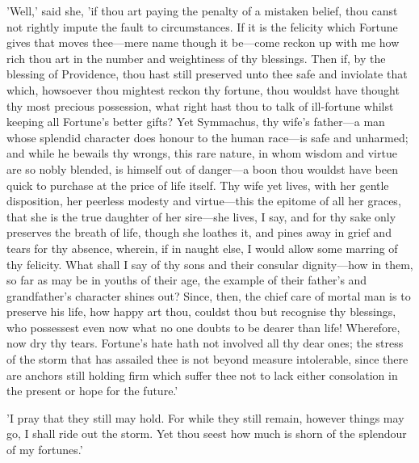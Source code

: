 'Well,' said she, 'if thou art paying the penalty of a mistaken belief,
thou canst not rightly impute the fault to circumstances. If it is the
felicity which Fortune gives that moves thee—mere name though it
be—come reckon up with me how rich thou art in the number and
weightiness of thy blessings. Then if, by the blessing of Providence,
thou hast still preserved unto thee safe and inviolate that which,
howsoever thou mightest reckon thy fortune, thou wouldst have thought
thy most precious possession, what right hast thou to talk of
ill-fortune whilst keeping all Fortune's better gifts? Yet Symmachus,
thy wife's father—a man whose splendid character does honour to the
human race—is safe and unharmed; and while he bewails thy wrongs, this
rare nature, in whom wisdom and virtue are so nobly blended, is himself
out of danger—a boon thou wouldst have been quick to purchase at the
price of life itself. Thy wife yet lives, with her gentle disposition,
her peerless modesty and virtue—this the epitome of all her graces,
that she is the true daughter of her sire—she lives, I say, and for thy
sake only preserves the breath of life, though she loathes it, and pines
away in grief and tears for thy absence, wherein, if in naught else, I
would allow some marring of thy felicity. What shall I say of thy sons
and their consular dignity—how in them, so far as may be in youths of
their age, the example of their father's and grandfather's character
shines out? Since, then, the chief care of mortal man is to preserve his
life, how happy art thou, couldst thou but recognise thy blessings, who
possessest even now what no one doubts to be dearer than life!
Wherefore, now dry thy tears. Fortune's hate hath not involved all thy
dear ones; the stress of the storm that has assailed thee is not beyond
measure intolerable, since there are anchors still holding firm which
suffer thee not to lack either consolation in the present or hope for
the future.'

'I pray that they still may hold. For while they still remain, however
things may go, I shall ride out the storm. Yet thou seest how much is
shorn of the splendour of my fortunes.'

